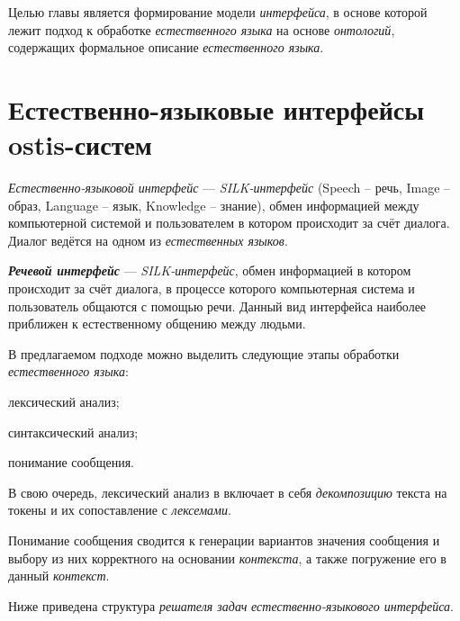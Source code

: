 Целью главы является формирование модели \textit{интерфейса}, в основе которой лежит подход к обработке \textit{естественного языка} на основе \textit{онтологий}, содержащих формальное описание \textit{естественного языка}.

\section{Естественно-языковые интерфейсы ostis-систем}
\label{section_natural_language_interface}

\textit{Естественно-языковой интерфейс} --- \textit{SILK-интерфейс} (Speech – речь, Image – образ, Language – язык, Knowledge – знание), обмен информацией между компьютерной системой и пользователем в котором происходит за счёт диалога.
Диалог ведётся на одном из \textit{естественных языков}.

\begin{SCn}


\end{SCn}

\textit{\textbf{Речевой интерфейс}} --- \textit{SILK-интерфейс}, обмен информацией в котором происходит за счёт диалога, в процессе которого компьютерная система и пользователь общаются с помощью речи.
Данный вид интерфейса наиболее приближен к естественному общению между людьми.

В предлагаемом подходе можно выделить следующие этапы обработки \textit{естественного языка}:
\begin{textitemize}
    \item лексический анализ;
    \item синтаксический анализ;
    \item понимание сообщения.
\end{textitemize}

В свою очередь, лексический анализ в включает в себя \textit{декомпозицию} текста на токены и их сопоставление с \textit{лексемами}.

Понимание сообщения сводится к генерации вариантов значения сообщения и выбору из них корректного на основании \textit{контекста}, а также погружение его в данный \textit{контекст}.

Ниже приведена структура \textit{решателя задач} \textit{естественно-языкового интерфейса}.

